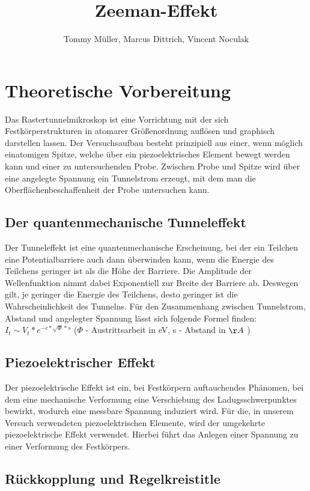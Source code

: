 \documentclass[10pt,a4paper]{article}
\author{Tommy Müller, Marcus Dittrich, Vincent Noculak}
\title{Zeeman-Effekt}
\begin{document}
\maketitle
\newpage
\newpage

\section{ Theoretische Vorbereitung}

Das Rastertunnelmikroskop ist eine Vorrichtung mit der sich Festkörperstrukturen in atomarer Größenordnung auflösen und graphisch darstellen lassen. Der Versuchsaufbau besteht prinzipiell aus einer, wenn möglich einatomigen Spitze, welche über ein piezoelektrisches Element bewegt werden kann und einer zu untersuchenden Probe. Zwischen Probe und Spitze wird über eine angelegte Spannung ein Tunnelstrom erzeugt, mit dem man die Oberflächenbeschaffenheit der Probe untersuchen kann.

\subsection{ Der quantenmechanische Tunneleffekt}

Der Tunneleffekt ist eine quantenmechanische Erscheinung, bei der ein Teilchen eine Potentialbarriere auch dann überwinden kann, wenn die Energie des Teilchens geringer ist als die Höhe der Barriere. Die Amplitude der Wellenfunktion nimmt dabei Exponentiell zur Breite der Barriere ab. Deswegen gilt, je geringer die Energie des Teilchens, desto geringer ist die Wahrscheinlichkeit des Tunnelns. Für den Zusammenhang zwischen Tunnelstrom, Abstand und angelegter Spannung lässt sich folgende Formel finden:
$I_{t} \sim V_{t} * e^{-c*\sqrt{\Phi }*s}$ ($\Phi$ - Austrittsarbeit in eV, s - Abstand in $\AA$  )

\subsection{	Piezoelektrischer Effekt}

Der piezoelektrische Effekt ist ein, bei Festkörpern auftauchendes Phänomen, bei dem eine mechanische Verformung eine Verschiebung des Ladugsschwerpunktes bewirkt, wodurch eine messbare Spannung induziert wird. Für die, in unserem Versuch verwendeten piezoelektrischen Elemente, wird der umgekehrte piezoelektrische Effekt verwendet. Hierbei führt das Anlegen einer Spannung zu einer Verformung des Festkörpers.

\subsection{	Rückkopplung und Regelkreistitle}
\end{document}
